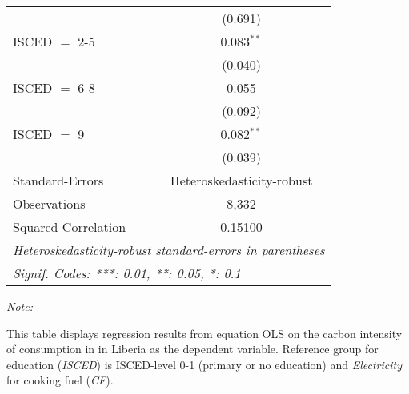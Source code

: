 \begin{table}[htbp!]
\begin{adjustbox}{width = 1\textwidth, max height = 0.95\textheight, center}
\begin{threeparttable}[b]
\begin{tabular}{lc}
                                & (0.691)\\   
            ISCED $=$ 2-5       & 0.083$^{**}$\\   
                                & (0.040)\\   
            ISCED $=$ 6-8       & 0.055\\   
                                & (0.092)\\   
            ISCED $=$ 9         & 0.082$^{**}$\\   
                                & (0.039)\\   
            \midrule 
            Standard-Errors     & Heteroskedasticity-robust \\   
            Observations        & 8,332\\  
            Squared Correlation & 0.15100\\  
            \midrule \midrule
            \multicolumn{2}{l}{\emph{Heteroskedasticity-robust standard-errors in parentheses}}\\
            \multicolumn{2}{l}{\emph{Signif. Codes: ***: 0.01, **: 0.05, *: 0.1}}\\
         \end{tabular}
         
         \begin{tablenotes}\item \medskip \textit{Note:}
            \item This table displays regression results from equation OLS on the carbon intensity of consumption in  in Liberia as the dependent variable. Reference group for education (\textit{ISCED}) is ISCED-level 0-1 (primary or no education) and \textit{Electricity} for cooking fuel (\textit{CF}).
         \end{tablenotes}
      \end{threeparttable}
   \end{adjustbox}
\end{table}


